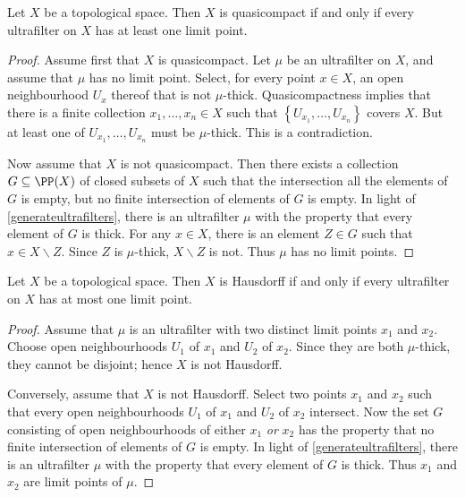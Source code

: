 \begin{lemma} \label{quasicompactiffeveryultrafilterhasalimitpoint}
	Let $ X $ be a topological space.
	Then $ X $ is quasicompact if and only if every ultrafilter on $ X $ has at least one limit point.
\end{lemma}

\begin{proof}
	Assume first that $ X $ is quasicompact.
	Let $ \mu $ be an ultrafilter on $ X $, and assume that $ \mu $ has no limit point.
	Select, for every point $ x \in X $, an open neighbourhood $ U_x $ thereof that is not $ \mu $-thick.
	Quasicompactness implies that there is a finite collection $ x_1, \dots, x_n \in X $ such that $ \left\{ U_{x_1}, \dots, U_{x_n} \right\} $ covers $ X $.
	But at least one of $ U_{x_1}, \dots, U_{x_n} $ must be $ \mu $-thick.
	This is a contradiction.

	Now assume that $ X $ is not quasicompact.
	Then there exists a collection $ G \subseteq \PP(X) $ of closed subsets of $ X $ such that the intersection all the elements of $ G $ is empty, but no finite intersection of elements of $ G $ is empty.
	In light of \ref{generateultrafilters}, there is an ultrafilter $ \mu $ with the property that every element of $ G $ is thick.
	For any $ x \in X $, there is an element $ Z \in G $ such that $ x \in X \smallsetminus Z $.
	Since $ Z $ is $ \mu $-thick, $ X \smallsetminus Z $ is not.
	Thus $ \mu $ has no limit points.
\end{proof}

\begin{lemma} \label{hausdorffiffeveryultrafilterhasatmostonelimitpoint}
	Let $ X $ be a topological space.
	Then $ X $ is Hausdorff if and only if every ultrafilter on $ X $ has at most one limit point.
\end{lemma}

\begin{proof}
	Assume that $ \mu $ is an ultrafilter with two distinct limit points $ x_1 $ and $ x_2 $.
	Choose open neighbourhoods $ U_1 $ of $ x_1 $ and $ U_2 $ of $ x_2 $.
	Since they are both $ \mu $-thick, they cannot be disjoint;
	hence $ X $ is not Hausdorff.

	Conversely, assume that $ X $ is not Hausdorff.
	Select two points $ x_1 $ and $ x_2 $ such that every open neighbourhoods $ U_1 $ of $ x_1 $ and $ U_2 $ of $ x_2 $ intersect.
	Now the set $ G $ consisting of open neighbourhoods of either $ x_1 $ \emph{or} $ x_2 $ has the property that no finite intersection of elements of $ G $ is empty.
	In light of \ref{generateultrafilters}, there is an ultrafilter $ \mu $ with the property that every element of $ G $ is thick.
	Thus $ x_1 $ and $ x_2 $ are limit points of $ \mu $.
\end{proof}

